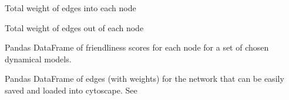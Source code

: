 \documentclass[letterpaper,10pt,english]{sphinxmanual}
\begin{document}
\begin{fulllineitems}
\begin{fulllineitems}
\end{fulllineitems}


\begin{fulllineitems}
\label{\detokenize{friendlynets:friendlyNet.friendlyNet.InDegree}}
\pysigstartsignatures
{}
\pysigstopsignatures
\sphinxAtStartPar
Total weight of edges into each node

\end{fulllineitems}


\begin{fulllineitems}
\label{\detokenize{friendlynets:friendlyNet.friendlyNet.OutDegree}}
\pysigstartsignatures
{}
\pysigstopsignatures
\sphinxAtStartPar
Total weight of edges out of each node

\end{fulllineitems}


\begin{fulllineitems}
\label{\detokenize{friendlynets:friendlyNet.friendlyNet.NodeScores}}
\pysigstartsignatures
{}
\pysigstopsignatures
\sphinxAtStartPar
Pandas DataFrame of friendliness scores for each node for a set of chosen dynamical models.

\end{fulllineitems}


\begin{fulllineitems}
\label{\detokenize{friendlynets:friendlyNet.friendlyNet.EdgeList}}
\pysigstartsignatures
{}
\pysigstopsignatures
\sphinxAtStartPar
Pandas DataFrame of edges (with weights) for the network that can be easily saved and loaded into cytoscape. See {\hyperref[\detokenize{friendlynets:friendlyNet.friendlyNet.make_edge_list}]{}}


\end{fulllineitems}
\end{fulllineitems}
\end{document}
